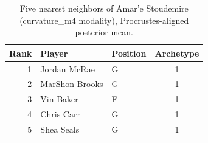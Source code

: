 \begin{table}[htbp]
  \centering\small
  \begin{tabular}{rllc}
    \toprule
    Rank & Player & Position & Archetype \\
    \midrule
    1 & Jordan McRae & G & 1 \\
    2 & MarShon Brooks & G & 1 \\
    3 & Vin Baker & F & 1 \\
    4 & Chris Carr & G & 1 \\
    5 & Shea Seals & G & 1 \\
    \bottomrule
  \end{tabular}
  \caption{Five nearest neighbors of Amar'e Stoudemire (curvature_m4 modality), Procrustes-aligned posterior mean.}
  \label{tab:Amar_e_Stoudemire_neighbors_curvature_m4}
\end{table}

